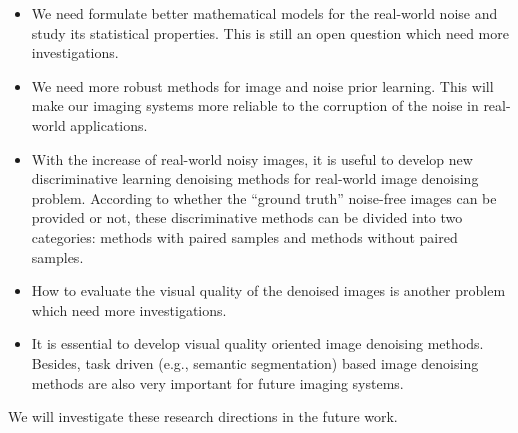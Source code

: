 \begin{itemize}
\item We need formulate better mathematical models for the real-world noise and study its statistical properties. This is still an open question which need more investigations.

\item We need more robust methods for image and noise prior learning. This will make our imaging systems more reliable to the corruption of the noise in real-world applications.

\item With the increase of real-world noisy images, it is useful to develop new discriminative learning denoising methods for real-world image denoising problem. According to whether the ``ground truth'' noise-free images can be provided or not, these discriminative methods can be divided into two categories: methods with paired samples and methods without paired samples. 

\item How to evaluate the visual quality of the denoised images is another problem which need more investigations.

\item It is essential to develop visual quality oriented image denoising methods. Besides, task driven (e.g., semantic segmentation) based image denoising methods are also very important for future imaging systems.

\end{itemize}

We will investigate these research directions in the future work.
